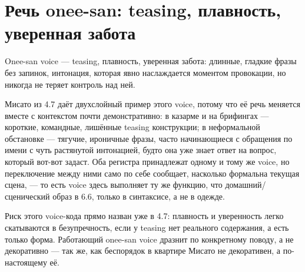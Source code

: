 \section{Речь onee-san: teasing, плавность, уверенная забота}

Onee-san voice — teasing, плавность, уверенная забота: длинные, гладкие фразы без запинок, интонация, которая явно наслаждается моментом провокации, но никогда не теряет контроль над ней.

Мисато из 4.7 даёт двухслойный пример этого voice, потому что её речь меняется вместе с контекстом почти демонстративно: в казарме и на брифингах — короткие, командные, лишённые teasing конструкции; в неформальной обстановке — тягучие, ироничные фразы, часто начинающиеся с обращения по имени с чуть растянутой интонацией, будто она уже знает ответ на вопрос, который вот-вот задаст. Оба регистра принадлежат одному и тому же voice, но переключение между ними само по себе сообщает, насколько формальна текущая сцена, — то есть voice здесь выполняет ту же функцию, что домашний/сценический образ в 6.6, только в синтаксисе, а не в одежде.

Риск этого voice-кода прямо назван уже в 4.7: плавность и уверенность легко скатываются в безупречность, если у teasing нет реального содержания, а есть только форма. Работающий onee-san voice дразнит по конкретному поводу, а не декоративно — так же, как беспорядок в квартире Мисато не декоративен, а по-настоящему её.
